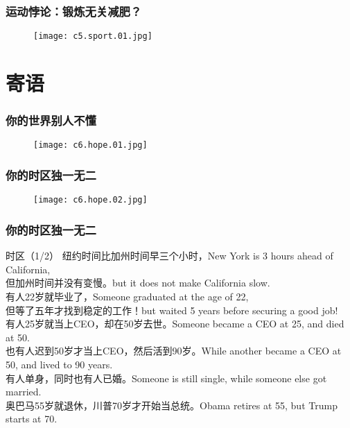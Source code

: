 \begin{frame}
  \frametitle{运动悖论：锻炼无关减肥？}
  \begin{figure}
    \centering
    \texttt{[image: c5.sport.01.jpg]}
  \end{figure}
\end{frame}

\section{寄语}
\begin{frame}
  \frametitle{你的世界别人不懂}
  \begin{figure}
    \centering
    \texttt{[image: c6.hope.01.jpg]}
  \end{figure}
\end{frame}

\begin{frame}
  \frametitle{你的时区独一无二}
  \begin{figure}
    \centering
    \texttt{[image: c6.hope.02.jpg]}
  \end{figure}
\end{frame}

\begin{frame}
  \frametitle{你的时区独一无二}
  \begin{block}{时区（1/2）}
纽约时间比加州时间早三个小时，New York is 3 hours ahead of California,\\
但加州时间并没有变慢。but it does not make California slow.\\
有人22岁就毕业了，Someone graduated at the age of 22,\\
但等了五年才找到稳定的工作！but waited 5 years before securing a good job!\\
有人25岁就当上CEO，却在50岁去世。Someone became a CEO at 25, and died at 50.\\
也有人迟到50岁才当上CEO，然后活到90岁。While another became a CEO at 50, and lived to 90 years.\\
有人单身，同时也有人已婚。Someone is still single, while someone else got married.\\
奥巴马55岁就退休，川普70岁才开始当总统。Obama retires at 55, but Trump starts at 70.\\
  \end{block}
\end{frame}


